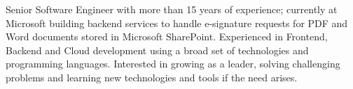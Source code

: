 

\begin{cvparagraph}
Senior Software Engineer with more than 15 years of experience; currently at Microsoft building backend services to handle e-signature requests for
PDF and Word documents stored in Microsoft SharePoint. Experienced in Frontend, Backend and Cloud development using a broad set of technologies and programming
languages. Interested in growing as a leader, solving challenging problems and learning new technologies and tools if the need arises.
\end{cvparagraph}    

